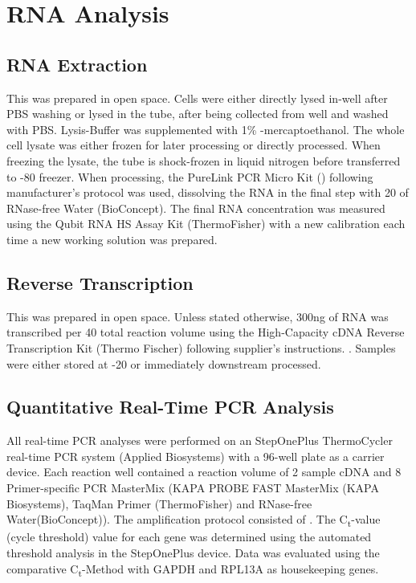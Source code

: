\section{RNA Analysis}
\subsection{RNA Extraction}
This was prepared in open space. Cells were either directly lysed in-well after PBS washing or lysed in the tube, after being collected from well and washed with PBS. Lysis-Buffer was supplemented with 1\% \textbeta-mercaptoethanol. The whole cell lysate was either frozen for later processing or directly processed. When freezing the lysate, the tube is shock-frozen in liquid nitrogen before transferred to -80 \degC freezer. When processing, the PureLink PCR Micro Kit () following manufacturer's protocol was used, dissolving the RNA in the final step with 20\mul{} of RNase-free Water (BioConcept). The final RNA concentration was measured using the Qubit RNA HS Assay Kit (ThermoFisher) with a new calibration each time a new working solution was prepared.

\subsection{Reverse Transcription}
This was prepared in open space. Unless stated otherwise, 300ng of RNA was transcribed per 40\mul{} total reaction volume using the High-Capacity cDNA Reverse Transcription Kit (Thermo Fischer) following supplier's instructions. . Samples were either stored at -20 \degC or immediately downstream processed. 

\subsection{Quantitative Real-Time PCR Analysis}
All real-time PCR analyses were performed on an StepOnePlus  ThermoCycler real-time PCR system (Applied Biosystems) with a 96-well plate as a carrier device. Each reaction well contained a reaction volume of 2\mul{} sample cDNA and 8\mul{} Primer-specific PCR MasterMix (KAPA PROBE FAST MasterMix (KAPA Biosystems), TaqMan\textregistered{} Primer (ThermoFisher) and RNase-free Water(BioConcept)). The amplification protocol consisted of . The C\textsubscript{t}-value (cycle threshold) value for each gene was determined using the automated threshold analysis in the StepOnePlus device. Data was evaluated using the comparative C\textsubscript{t}-Method with GAPDH and RPL13A as housekeeping genes.

